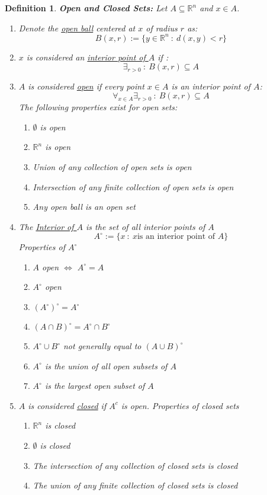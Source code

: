 \documentclass[]{article}
\newcommand{\R}{\mathbb{R}}
\newcommand{\st}{\ : \ }
\newtheorem{definition}{Definition}
\begin{document}
\begin{definition}
    \emph{\textbf{Open and Closed Sets:}} 
    Let $A \subseteq \R^n$ and $x \in A$.
    \begin{enumerate}
        \item Denote the \emph{\underline{open ball}} centered at $x$ of radius $r$ as: \[
            B(x,r) := \{
                y \in \R^n \st d(x,y) < r
            \}
        \] \item $x$ is considered an \emph{\underline{interior point of $A$}} if :\[
            \exists_{r > 0} \st B(x,r) \subseteq A
        \] \item  $A$ is considered \emph{\underline{open}} if every point $x \in A$ is an interior point of $A$: \[
            \forall_{x \in A} \exists_{r>0} \st B(x,r) \subseteq A
        \] The following properties exist for open sets:\begin{enumerate}
            \item $\emptyset$ is open
            \item $\R^n$ is open
            \item Union of any collection of open sets is open
            \item Intersection of any finite collection of open sets is open
            \item Any open ball is an open set
        \end{enumerate}
        \item The \emph{\underline{Interior of $A$}} is the set of all interior points of $A$ \[
            A^\circ := \{
                x \st x \text{is an interior point of $A$}
            \}
        \] Properties of $A^\circ$ \begin{enumerate}
            \item $A$ open $\iff$ $A^\circ = A$
            \item $A^\circ$ open
            \item $(A^\circ)^\circ = A^\circ$
            \item $(A \cap B)^\circ = A^\circ \cap B^\circ$
            \item $A^\circ \cup B^\circ$ not generally equal to $(A \cup B)^\circ$
            \item $A^\circ$ is the union of all open subsets of $A$
            \item $A^\circ$ is the largest open subset of $A$
        \end{enumerate}
        \item $A$ is considered \emph{\underline{closed}} if $A^c$ is open. 
        Properties of closed sets \begin{enumerate}
            \item $\R^n$ is closed
            \item $\emptyset$ is closed
            \item The intersection of any collection of closed sets is closed
            \item The union of any finite collection of closed sets is closed
        \end{enumerate}
    \end{enumerate}
\end{definition}
\end{document}
